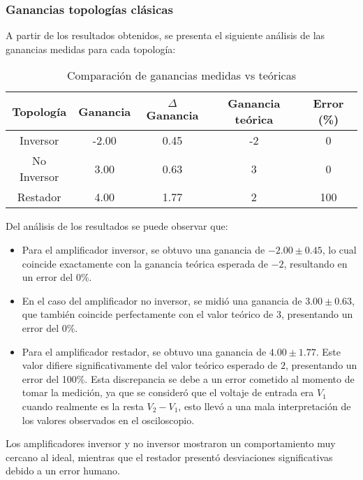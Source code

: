 \subsubsection{Ganancias topologías clásicas}

A partir de los resultados obtenidos, se presenta el siguiente análisis de las ganancias medidas para cada topología:

\begin{table}[ht]
\centering
\begin{tabular}{|c|c|c|c|c|}
\hline
Topología & Ganancia & $\Delta$ Ganancia & Ganancia teórica & Error (\%) \\ \hline
Inversor & -2.00 & 0.45 & -2 & 0 \\ \hline
No Inversor & 3.00 & 0.63 & 3 & 0 \\ \hline
Restador & 4.00 & 1.77 & 2 & 100 \\ \hline
\end{tabular}
\caption{Comparación de ganancias medidas vs teóricas}
\label{tab:comparacion-ganancias}
\end{table}

Del análisis de los resultados se puede observar que:

\begin{itemize}
    \item Para el amplificador inversor, se obtuvo una ganancia de $-2.00 \pm 0.45$, lo cual coincide exactamente con la ganancia teórica esperada de $-2$, resultando en un error del 0\%.
    
    \item En el caso del amplificador no inversor, se midió una ganancia de $3.00 \pm 0.63$, que también coincide perfectamente con el valor teórico de $3$, presentando un error del 0\%.
    
    \item Para el amplificador restador, se obtuvo una ganancia de $4.00 \pm 1.77$. Este valor difiere significativamente del valor teórico esperado de $2$, presentando un error del 100\%. Esta discrepancia se debe a un error cometido al momento de tomar la medición, ya que se consideró que el voltaje de entrada era $V_1$ cuando realmente es la resta $V_2 - V_1$, esto llevó a una mala interpretación de los valores observados en el osciloscopio.
\end{itemize}

Los amplificadores inversor y no inversor mostraron un comportamiento muy cercano al ideal, mientras que el restador presentó desviaciones significativas debido a un error humano.

